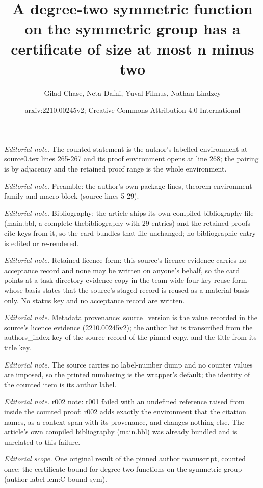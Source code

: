 \documentclass[10pt,a4paper]{article}
\title{A degree-two symmetric function on the symmetric group has a certificate of size at most n minus two}
\author{Gilad Chase, Neta Dafni, Yuval Filmus, Nathan Lindzey}
\date{arxiv:2210.00245v2; Creative Commons Attribution 4.0 International}
\theoremstyle{definition}
\begin{document}
\maketitle
\noindent\textit{Editorial note.} The counted statement is the author's labelled environment at source0.tex lines 265-267 and its proof environment opens at line 268; the pairing is by adjacency and the retained proof range is the whole environment.\par\medskip
\noindent\textit{Editorial note.} Preamble: the author's own package lines, theorem-environment family and macro block (source lines 5-29).\par\medskip
\noindent\textit{Editorial note.} Bibliography: the article ships its own compiled bibliography file (main.bbl, a complete thebibliography with 29 entries) and the retained proofs cite keys from it, so the card bundles that file unchanged; no bibliographic entry is edited or re-rendered.\par\medskip
\noindent\textit{Editorial note.} Retained-licence form: this source's licence evidence carries no acceptance record and none may be written on anyone's behalf, so the card points at a task-directory evidence copy in the team-wide four-key reuse form whose basis states that the source's staged record is reused as a material basis only. No status key and no acceptance record are written.\par\medskip
\noindent\textit{Editorial note.} Metadata provenance: source\_version is the value recorded in the source's licence evidence (2210.00245v2); the author list is transcribed from the authors\_index key of the source record of the pinned copy, and the title from its title key.\par\medskip
\noindent\textit{Editorial note.} The source carries no label-number dump and no counter values are imposed, so the printed numbering is the wrapper's default; the identity of the counted item is its author label.\par\medskip
\noindent\textit{Editorial note.} r002 note: r001 failed with an undefined reference raised from inside the counted proof; r002 adds exactly the environment that the citation names, as a context span with its provenance, and changes nothing else. The article's own compiled bibliography (main.bbl) was already bundled and is unrelated to this failure.\par\medskip
\noindent\textit{Editorial scope.} One original result of the pinned author manuscript, counted once: the certificate bound for degree-two functions on the symmetric group (author label lem:C-bound-sym).\par\medskip
\end{document}
